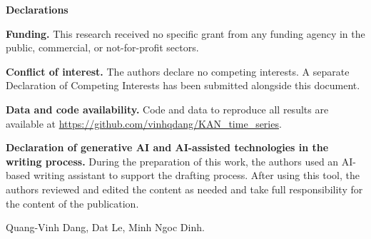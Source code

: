 \documentclass[11pt]{article}
\begin{document}
\begin{center}\large\textbf{Declarations}\end{center}
\vspace{1em}

\textbf{Funding.} This research received no specific grant from any funding
agency in the public, commercial, or not-for-profit sectors.

\vspace{1em}
\textbf{Conflict of interest.} The authors declare no competing interests. A
separate Declaration of Competing Interests has been submitted alongside this
document.

\vspace{1em}
\textbf{Data and code availability.} Code and data to reproduce all results
are available at \url{https://github.com/vinhqdang/KAN_time_series}.

\vspace{1em}
\textbf{Declaration of generative AI and AI-assisted technologies in the
writing process.} During the preparation of this work, the authors used an
AI-based writing assistant to support the drafting process. After using this
tool, the authors reviewed and edited the content as needed and take full
responsibility for the content of the publication.

\vspace{2em}
\noindent Quang-Vinh Dang, Dat Le, Minh Ngoc Dinh.
\end{document}
